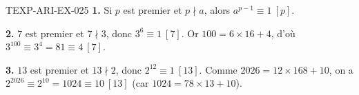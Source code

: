 \begin{corrige}{TEXP-ARI-EX-025}
\textbf{1.} Si $p$ est premier et $p\nmid a$, alors $a^{p-1}\equiv1\ [p]$.

\textbf{2.} $7$ est premier et $7\nmid3$, donc $3^6\equiv1\ [7]$. Or
$100=6\times16+4$, d'où $3^{100}\equiv3^4=81\equiv4\ [7]$.

\textbf{3.} $13$ est premier et $13\nmid2$, donc $2^{12}\equiv1\ [13]$. Comme
$2026=12\times168+10$, on a $2^{2026}\equiv2^{10}=1024\equiv10\ [13]$ (car
$1024=78\times13+10$).
\end{corrige}
